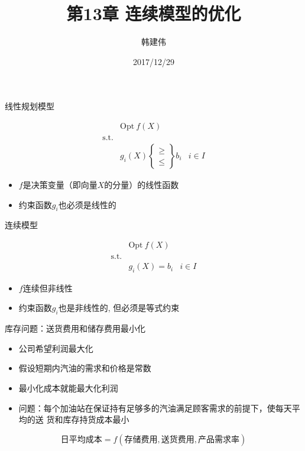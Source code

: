 \documentclass[mathserif, table]{beamer}
\title{第13章 连续模型的优化}
\author{韩建伟}
\institute{
  信息学院\\
  \texttt{mm@hanjianwei.com}
}
\date{2017/12/29}
\begin{document}
\begin{frame}[plain]
  \titlepage{}
\end{frame}

\begin{frame}{线性规划模型}
  \begin{block}{}
    \[ 
    \begin{array}{lcl}
      & \mbox{Opt}\ f(X) & \\
      \mbox{s.t.} & &  \\
      &
      g_i(X) \left\{
        \begin{array}{c}
          \ge\\
          \le
        \end{array}
      \right\} b_i& i \in I
    \end{array}
    \]
  \end{block}

  \begin{itemize}
  \item $f$是决策变量（即向量$X$的分量）的线性函数
  \item 约束函数$g_i$也必须是线性的
  \end{itemize}
  
\end{frame}

\begin{frame}{连续模型}
  \begin{block}{}
    \[ 
    \begin{array}{lcl}
      & \mbox{Opt}\ f(X) & \\
      \mbox{s.t.} & &  \\
      &
      g_i(X) = b_i& i \in I
    \end{array}
    \]
  \end{block}

  \begin{itemize}
  \item $f$连续但非线性
  \item 约束函数$g_i$也是非线性的, 但必须是等式约束
  \end{itemize}
  
\end{frame}

\begin{frame}{库存问题：送货费用和储存费用最小化}

  \begin{itemize}
  \item<1-> 公司希望利润最大化
  \item<2-> 假设短期内汽油的需求和价格是常数
  \item<3-> 最小化成本就能最大化利润
  \item<4-> 问题：每个加油站在保证持有足够多的汽油满足顾客需求的前提下，使每天平均的送
    货和库存持货成本最小 
  \end{itemize}

   {
    \[
      \text{日平均成本} = f(\text{存储费用}, \text{送货费用}, \text{产品需求率})
    \]
  }
  
\end{frame}
\end{document}
